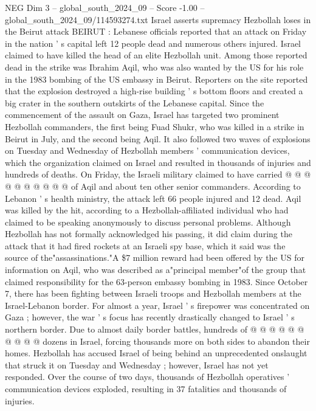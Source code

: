 \begin{textsample}{NEG Dim 3 – global\_south\_2024\_09 – Score -1.00 – global\_south\_2024\_09/114593274.txt}  \label{ex:f3_neg_130}
Israel asserts supremacy Hezbollah loses in the Beirut attack BEIRUT : Lebanese officials reported that an attack on Friday in the nation ' s capital left 12 people dead and numerous others injured.
Israel claimed to have killed the head of an elite Hezbollah unit.
Among those reported dead in the strike was Ibrahim Aqil, who was also wanted by the US for his role in the 1983 bombing of the US embassy in Beirut.
Reporters on the site reported that the explosion destroyed a high-rise building ' s bottom floors and created a big crater in the southern outskirts of the Lebanese capital.
Since the commencement of the assault on Gaza, Israel has targeted two prominent Hezbollah commanders, the first being Fuad Shukr, who was killed in a strike in Beirut in July, and the second being Aqil.
It also followed two waves of explosions on Tuesday and Wednesday of Hezbollah members ' communication devices, which the organization claimed on Israel and resulted in thousands of injuries and hundreds of deaths.
On Friday, the Israeli military claimed to have carried @ @ @ @ @ @ @ @ @ @ of Aqil and about ten other senior commanders.
According to Lebanon ' s health ministry, the attack left 66 people injured and 12 dead.
Aqil was killed by the hit, according to a Hezbollah-affiliated individual who had claimed to be speaking anonymously to discuss personal problems.
Although Hezbollah has not formally acknowledged his passing, it did claim during the attack that it had fired rockets at an Israeli spy base, which it said was the source of the"assassinations."A \$7 million reward had been offered by the US for information on Aqil, who was described as a"principal member"of the group that claimed responsibility for the 63-person embassy bombing in 1983.
Since October 7, there has been fighting between Israeli troops and Hezbollah members at the Israel-Lebanon border.
For almost a year, Israel ' s firepower was concentrated on Gaza ; however, the war ' s focus has recently drastically changed to Israel ' s northern border.
Due to almost daily border battles, hundreds of @ @ @ @ @ @ @ @ @ @ dozens in Israel, forcing thousands more on both sides to abandon their homes.
Hezbollah has accused Israel of being behind an unprecedented onslaught that struck it on Tuesday and Wednesday ; however, Israel has not yet responded.
Over the course of two days, thousands of Hezbollah operatives ' communication devices exploded, resulting in 37 fatalities and thousands of injuries.

\end{textsample}
